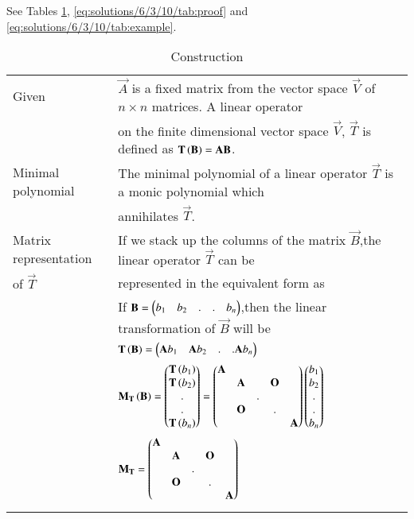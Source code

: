 See Tables     \ref{eq:solutions/6/3/10/tab:construction},     \ref{eq:solutions/6/3/10/tab:proof} and     \ref{eq:solutions/6/3/10/tab:example}.



\onecolumn
\begin{longtable}{|l|l|}
    \hline
        Given &  $\vec{A}$ is a fixed matrix from the vector space $\vec{V}$ of $n\times n$ matrices. A linear operator \\
        &on the finite dimensional vector space $\vec{V}$, $\vec{T}$ is defined as $\mathbf{T\left(B\right)}=\mathbf{AB}$.\\
    \hline
        Minimal polynomial & The minimal polynomial of a linear operator $\vec{T}$ is a monic polynomial which \\
        &annihilates $\vec{T}$.\\
    \hline
        Matrix representation & If we stack up the columns of the matrix $\vec{B}$,the linear operator $\vec{T}$ can be \\
        of $\vec{T}$ & represented in the equivalent form as \\
        & If $\mathbf{B}=\begin{pmatrix}b_1&b_2&.&.&b_n\end{pmatrix}$,then the linear transformation of $\vec{B}$ will be\\
        &$\mathbf{T\left(B\right)}=\begin{pmatrix}\mathbf{A}b_1&\mathbf{A}b_2&.&.\mathbf{A}b_n\end{pmatrix}$\\
        & $\mathbf{M_T\left(B\right)}=\begin{pmatrix}\mathbf{T}\left(b_1\right)\\\mathbf{T}\left(b_2\right)\\.\\.\\\mathbf{T}\left(b_n\right)\end{pmatrix}=\begin{pmatrix}\mathbf{A}&&&&\\&\mathbf{A}&&\mathbf{O}&\\&&.&&\\&\mathbf{O}&&.&\\&&&&\mathbf{A}\end{pmatrix}\begin{pmatrix}b_1\\b_2\\.\\.\\b_n\end{pmatrix}$\\
    \hline
        & $\mathbf{M_T}=\begin{pmatrix}\mathbf{A}&&&&\\&\mathbf{A}&&\mathbf{O}&\\&&.&&\\&\mathbf{O}&&.&\\&&&&\mathbf{A}\end{pmatrix}$\\
    \hline
    \caption{Construction}
    \label{eq:solutions/6/3/10/tab:construction}
\end{longtable}
